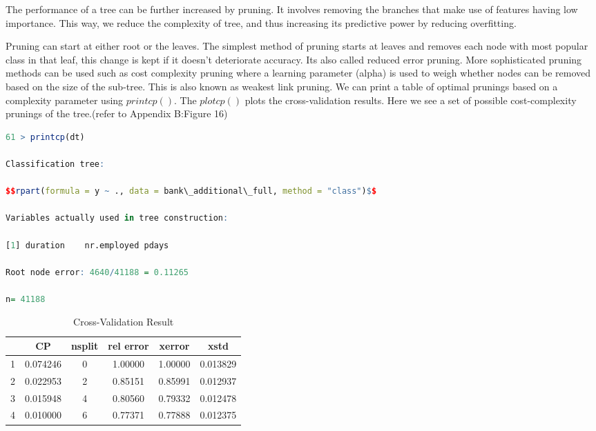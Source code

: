 \documentclass[12pt, a4paper, bibliography=totoc, english]{scrartcl}
\begin{document}
The performance of a tree can be further increased by pruning. It involves removing the branches that make use of features having low importance. This way, we reduce the complexity of tree, and thus increasing its predictive power by reducing overfitting.

Pruning can start at either root or the leaves. The simplest method of pruning starts at leaves and removes each node with most popular class in that leaf, this change is kept if it doesn't deteriorate accuracy. Its also called reduced error pruning. More sophisticated pruning methods can be used such as cost complexity pruning where a learning parameter (alpha) is used to weigh whether nodes can be removed based on the size of the sub-tree. This is also known as weakest link pruning.
We can print a table of optimal prunings based on a complexity parameter using $printcp()$. The $plotcp()$ plots the cross-validation results.  Here we see a set of possible cost-complexity prunings of the tree.(refer to Appendix B:Figure 16)

\begin{lstlisting}[language = R]
61 > printcp(dt)

Classification tree:

$$rpart(formula = y ~ ., data = bank\_additional\_full, method = "class")$$

Variables actually used in tree construction:

[1] duration    nr.employed pdays  

Root node error: 4640/41188 = 0.11265

n= 41188
\end{lstlisting}



\begin{table}[!hbp]
	\centering
	\begin{tabular}{|c|c|c|c|c|c|}
		\hline
		& CP & nsplit & rel error & xerror & xstd \\
		\hline
		1 & 0.074246 & 0 & 1.00000 & 1.00000 & 0.013829\\
		\hline
		2 & 0.022953 & 2 & 0.85151 & 0.85991 & 0.012937\\
		\hline
		3 & 0.015948 & 4 & 0.80560 & 0.79332 & 0.012478\\
		\hline
		4 & 0.010000 & 6 & 0.77371 & 0.77888 & 0.012375\\
		\hline
	\end{tabular}
	\caption{Cross-Validation Result} 
\end{table}
\end{document}
